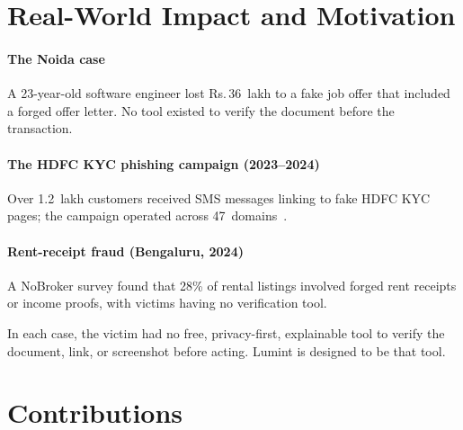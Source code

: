 \documentclass[conference]{IEEEtran}
\def\rupee{\textrm{Rs.\,}}
\begin{document}
\section{Real-World Impact and Motivation}

\paragraph{The Noida case} A 23-year-old software engineer lost
\rupee{}36~lakh to a fake job offer that included a forged offer
letter. No tool existed to verify the document before the transaction.

\paragraph{The HDFC KYC phishing campaign (2023--2024)} Over
1.2~lakh customers received SMS messages linking to fake HDFC KYC
pages; the campaign operated across 47~domains~\cite{certin2024}.

\paragraph{Rent-receipt fraud (Bengaluru, 2024)} A NoBroker survey
found that 28\% of rental listings involved forged rent receipts or
income proofs, with victims having no verification tool.

In each case, the victim had no free, privacy-first, explainable tool to
verify the document, link, or screenshot before acting. Lumint is
designed to be that tool.

\section{Contributions}
\end{document}
